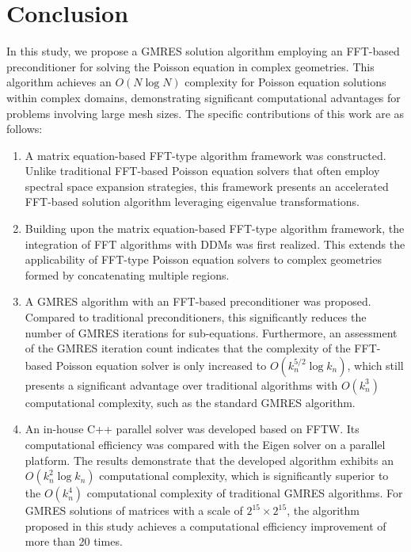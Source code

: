 \documentclass[preprint]{elsarticle}
\begin{document}
\section{Conclusion}
\label{sec:conclusion}
In this study, we propose a GMRES solution algorithm employing an FFT-based preconditioner for solving the Poisson equation in complex geometries. This algorithm achieves an $O(N \log N)$ complexity for Poisson equation solutions within complex domains, demonstrating significant computational advantages for problems involving large mesh sizes. The specific contributions of this work are as follows:

\begin{enumerate}
    \item A matrix equation-based FFT-type algorithm framework was constructed. Unlike traditional FFT-based Poisson equation solvers that often employ spectral space expansion strategies, this framework presents an accelerated FFT-based solution algorithm leveraging eigenvalue transformations.
    \item Building upon the matrix equation-based FFT-type algorithm framework, the integration of FFT algorithms with DDMs was first realized. This extends the applicability of FFT-type Poisson equation solvers to complex geometries formed by concatenating multiple regions.
    \item A GMRES algorithm with an FFT-based preconditioner was proposed. Compared to traditional preconditioners, this significantly reduces the number of GMRES iterations for sub-equations. Furthermore, an assessment of the GMRES iteration count indicates that the complexity of the FFT-based Poisson equation solver is only increased to $O(k_n^{5/2}\log k_n)$, which still presents a significant advantage over traditional algorithms with $O(k_n^3)$ computational complexity, such as the standard GMRES algorithm.
    \item An in-house C++ parallel solver was developed based on FFTW. Its computational efficiency was compared with the Eigen solver on a parallel platform. The results demonstrate that the developed algorithm exhibits an $O(k_n^2\log k_n)$ computational complexity, which is significantly superior to the $O(k_n^4)$ computational complexity of traditional GMRES algorithms. For GMRES solutions of matrices with a scale of $2^{15}\times2^{15}$, the algorithm proposed in this study achieves a computational efficiency improvement of more than 20 times.
\end{enumerate}
\end{document}

